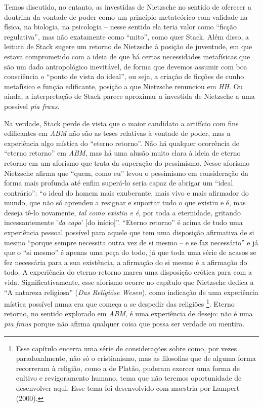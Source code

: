 \documentclass[
	12pt,				%
	openright,			%
	oneside,			%
	a4paper,			%
	english,			%
	french,				%
	spanish,			%
	brazil				%
	]{abntex2}
\begin{document}
Temos discutido, no entanto, as investidas de Nietzsche no sentido de oferecer a doutrina da vontade de poder como um princípio metateórico com validade na física, na biologia, na psicologia –  nesse sentido ela teria valor como “ficção regulativa”, mas não exatamente como “mito”, como quer Stack. Além disso, a leitura de Stack sugere um retorno de Nietzsche à posição de juventude, em que estava comprometido com a ideia de que há certas necessidades metafísicas que são um dado antropológico inevitável, de forma que devemos assumir com boa consciência o “ponto de vista do ideal”, ou seja, a criação de ficções de cunho metafísico e função edificante, posição a que Nietzsche renunciou em \textit{HH}. Ou ainda, a interpretação de Stack parece aproximar a investida de Nietzsche a uma possível \textit{pia fraus}. 

	Na verdade, Stack perde de vista que o maior candidato a artifício com fins edificantes em \textit{ABM} não são as teses relativas à vontade de poder, mas a experiência algo mística do “eterno retorno”. Não há qualquer ocorrência de “eterno retorno” em \textit{ABM}, mas há uma alusão muito clara à ideia de eterno retorno em um aforismo que trata da superação do pessimismo. Nesse aforismo Nietzsche afirma que “quem, como eu” levou o pessimismo em consideração da forma mais profunda até enfim superá-lo seria capaz de abrigar um “ideal contrário”:  “o ideal do homem mais exuberante, mais vivo e mais afirmador do mundo, que não só aprendeu a resignar e suportar tudo o que existiu e é, mas deseja tê-lo novamente, \textit{tal como existiu e é}, por toda a eternidade, gritando incessantemente '\textit{da capo}' [do início]”. “Eterno retorno” é acima de tudo uma experiência pessoal possível para aquele que tem uma disposição afirmativa de si mesmo  “porque sempre necessita outra vez de si mesmo – e se faz necessário” e já que o “si mesmo” é apenas uma peça do todo, já que toda uma série de acasos se fez necessária para a sua existência, a afirmação do si mesmo é a afirmação do todo. A experiência do eterno retorno marca uma disposição erótica para com a vida. Significativamente, esse aforismo ocorre no capítulo que Nietzsche dedica a “A natureza religiosa” (\textit{Das Religiöse Wesen}), como indicação de uma experiência mística possível numa era que começa a se despedir das religiões
\footnote{Esse capítulo encerra uma série de considerações sobre como, por vezes paradoxalmente, não só o cristianismo, mas as filosofias que de alguma forma recorreram à religião, como a de Platão, puderam exercer uma forma de cultivo e revigoramento humano, tema que não teremos oportunidade de desenvolver aqui. Esse tema foi desenvolvido com maestria por Lampert (2000).}. 
Eterno retorno, no sentido explorado em \textit{ABM}, é uma experiência de desejo: não é uma \textit{pia fraus} porque não afirma qualquer coisa que possa ser verdade ou mentira.
\end{document}
